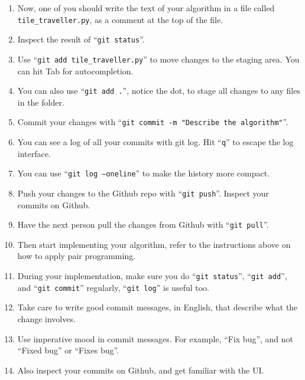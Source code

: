 \begin{enumerate}
    \item
    Now, one of you should write the text of your algorithm in a file called \texttt{tile\_traveller.py}, 
    as a comment at the top of the file.

    \item
    Inspect the result of ``\texttt{git status}''.

    \item
    Use ``\texttt{git add tile\_traveller.py}''
    to move changes to the staging area.
    You can hit Tab for autocompletion.

    \item
    You can also use ``\texttt{git add .}'', notice the dot,
    to stage all changes to any files in the folder.

    \item
    Commit your changes with ``\texttt{git commit -m "Describe the algorithm"}''.

    \item
    You can see a log of all your commits with git log. Hit ``\texttt{q}'' to escape the log interface.

    \item
    You can use ``\texttt{git log --oneline}'' to make the history more compact.

    \item
    Push your changes to the Github repo with ``\texttt{git push}''.
    Inspect your commits on Github.

    \item
    Have the next person pull the changes from Github with ``\texttt{git pull}''.

    \item
    Then start implementing your algorithm,
    refer to the instructions above on how to apply pair programming.

    \item
    During your implementation, make sure you do ``\texttt{git status}'', ``\texttt{git add}'',
    and ``\texttt{git commit}'' regularly,
    ``\texttt{git log}'' is useful too.

    \item
    Take care to write good commit messages, in English,
    that describe what the change involves.

    \item
    Use imperative mood in commit messages. 
    For example, ``Fix bug'', and not ``Fixed bug'' or ``Fixes bug''.

    \item
    Also inspect your commits on Github, and get familiar with the UI.
\end{enumerate}
